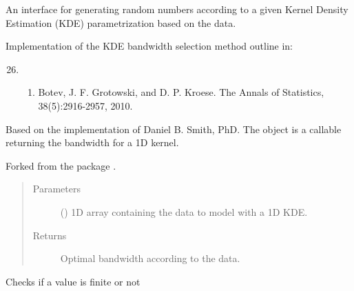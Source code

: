 \documentclass[letterpaper,10pt,english]{sphinxmanual}
\begin{document}
\begin{fulllineitems}
\label{\detokenize{index:brainSimulator.KDEestimator}}
An interface for generating random numbers according
to a given Kernel Density Estimation (KDE) parametrization based on the 
data.

\begin{fulllineitems}
\label{\detokenize{index:brainSimulator.KDEestimator.botev_bandwidth}}
Implementation of the KDE bandwidth selection method outline in:
\begin{enumerate}
\setcounter{enumi}{25}
\item {} \begin{enumerate}
\item {} 
Botev, J. F. Grotowski, and D. P. Kroese.  The Annals of Statistics, 38(5):2916-2957, 2010.

\end{enumerate}

\end{enumerate}

Based on the implementation of Daniel B. Smith, PhD. The object is a callable returning the bandwidth for a 1D kernel.

Forked from the package .
\begin{quote}\begin{description}
\item[{Parameters}] \leavevmode
{} () \textendash{} 1D array containing the data to model with a 1D KDE.

\item[{Returns}] \leavevmode
Optimal bandwidth according to the data.

\end{description}\end{quote}

\end{fulllineitems}


\begin{fulllineitems}
\label{\detokenize{index:brainSimulator.KDEestimator.finite}}
Checks if a value is finite or not

\end{fulllineitems}


\end{fulllineitems}
\end{document}
